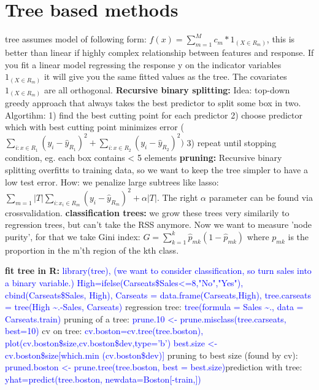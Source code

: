 \section{Tree based methods}
tree assumes model of following form: 
$f(x) = \sum_{m=1}^M c_m*1_{(X \in R_m)}$, this is better than linear if highly complex relationship between features and response. If you fit a linear model regressing the response y on the indicator variables $1_{(X \in R_m)}$ it will give you the same fitted values as the tree. The covariates $1_{(X \in R_m)}$ are all orthogonal.
\textbf{Recursive binary splitting: }
Idea: top-down greedy approach that always takes the best predictor to split some box in two. Algortihm:
1) find the best cutting point for each predictor
2) choose predictor which with best cutting point minimizes error ($\sum_{i:x \in R_1}(y_i-\hat y_{R_1})^2+\sum_{i:x \in R_2}(y_i-\hat y_{R_2})^2)$
3) repeat until stopping condition, eg. each box contains < 5 elements
\textbf{pruning: } Recursive binary splitting overfitts to training data, so we want to keep the tree simpler to have a low test error. How: we penalize large subtrees like lasso: $\sum_{m=1}{|T|}\sum_{i: x_i \in R_m}(y_i - \hat y_{R_m})^2 + \alpha|T|$. The right $\alpha$ parameter can be found via crossvalidation. 
\textbf{classification trees: } we grow these trees very similarily to regression trees, but can't take the RSS anymore. Now we want to measure 'node purity', for that we take Gini index: $G = \sum_{k=1}^k \hat p_{mk}(1-\hat p_{mk})$ where $p_{mk}$ is the proportion in the m'th region of the kth class.

\textbf{fit tree in R:} \textcolor{blue}{library(tree), (we want to consider classification, so turn sales into a binary variable.)
High=ifelse(Carseats\$Sales<=8,"No","Yes"), cbind(Carseats\$Sales, High), Carseats = data.frame(Carseats,High), tree.carseats = tree(High \textasciitilde .-Sales, Carseats)}
regression tree: \textcolor{blue}{tree(formula = Sales \textasciitilde ., data = Carseats.train)} pruning of a tree: \textcolor{blue}{prune.10 <- prune.misclass(tree.carseats, best=10)} cv on tree: \textcolor{blue}{cv.boston=cv.tree(tree.boston), plot(cv.boston\$size,cv.boston\$dev,type='b') best.size <- cv.boston\$size[which.min (cv.boston\$dev)]} pruning to best size (found by cv): \textcolor{blue}{pruned.boston <- prune.tree(tree.boston, best = best.size)}prediction with tree: \textcolor{blue}{yhat=predict(tree.boston, newdata=Boston[-train,])}